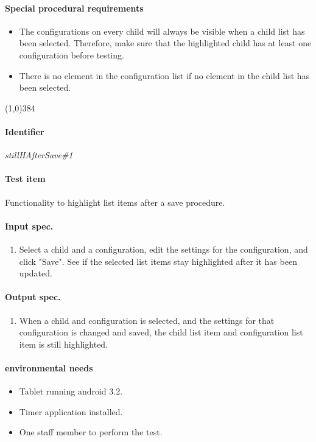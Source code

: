 \paragraph{Special procedural requirements}
	\begin{itemize}
		\item The configurations on every child will always be visible when a child list has been selected. Therefore, make sure that the highlighted child has at least one configuration before testing.
		\item There is no element in the configuration list if no element in the child list has been selected.
	\end{itemize}
\begin{center}
	\line(1,0){384}
\end{center}

\pagebreak
\paragraph{Identifier}
	\textit{stillHAfterSave\#1}
\paragraph{Test item}
	Functionality to highlight list items after a save procedure.
\paragraph{Input spec.}
	\begin{enumerate}
		\item Select a child and a configuration, edit the settings for the configuration, and click "Save". See if the selected list items stay highlighted after it has been updated.
	\end{enumerate}
\paragraph{Output spec.}
	\begin{enumerate}
		\item When a child and configuration is selected, and the settings for that configuration is changed and saved, the child list item and configuration list item is still highlighted.
	\end{enumerate}
\paragraph{environmental needs}
	\begin{itemize}
		\item Tablet running android 3.2.
		\item Timer application installed.
		\item One staff member to perform the test.
	\end{itemize}
